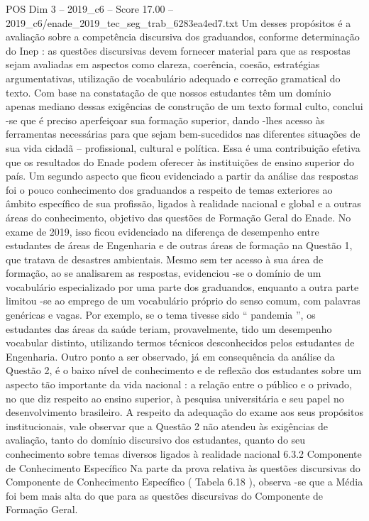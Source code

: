 \begin{textsample}{POS Dim 3 – 2019\_c6 – Score 17.00 – 2019\_c6/enade\_2019\_tec\_seg\_trab\_6283ea4ed7.txt}
Um desses propósitos é a avaliação sobre a competência discursiva dos graduandos, conforme determinação do Inep : as questões discursivas devem fornecer material para que as respostas sejam avaliadas em aspectos como clareza, coerência, coesão, estratégias argumentativas, utilização de vocabulário adequado e correção gramatical do texto.
Com base na constatação de que nossos estudantes têm um domínio apenas mediano dessas exigências de construção de um texto formal culto, conclui -se que é preciso aperfeiçoar sua formação superior, dando -lhes acesso às ferramentas necessárias para que sejam bem-sucedidos nas diferentes situações de sua vida cidadã – profissional, cultural e política.
Essa é uma contribuição efetiva que os resultados do Enade podem oferecer às instituições de ensino superior do país.
Um segundo aspecto que ficou evidenciado a partir da análise das respostas foi o pouco conhecimento dos graduandos a respeito de temas exteriores ao âmbito específico de sua profissão, ligados à realidade nacional e global e a outras áreas do conhecimento, objetivo das questões de Formação Geral do Enade.
No exame de 2019, isso ficou evidenciado na diferença de desempenho entre estudantes de áreas de Engenharia e de outras áreas de formação na Questão 1, que tratava de desastres ambientais.
Mesmo sem ter acesso à sua área de formação, ao se analisarem as respostas, evidenciou -se o domínio de um vocabulário especializado por uma parte dos graduandos, enquanto a outra parte limitou -se ao emprego de um vocabulário próprio do senso comum, com palavras genéricas e vagas.
Por exemplo, se o tema tivesse sido “ pandemia ”, os estudantes das áreas da saúde teriam, provavelmente, tido um desempenho vocabular distinto, utilizando termos técnicos desconhecidos pelos estudantes de Engenharia.
Outro ponto a ser observado, já em consequência da análise da Questão 2, é o baixo nível de conhecimento e de reflexão dos estudantes sobre um aspecto tão importante da vida nacional : a relação entre o público e o privado, no que diz respeito ao ensino superior, à pesquisa universitária e seu papel no desenvolvimento brasileiro.
A respeito da adequação do exame aos seus propósitos institucionais, vale observar que a Questão 2 não atendeu às exigências de avaliação, tanto do domínio discursivo dos estudantes, quanto do seu conhecimento sobre temas diversos ligados à realidade nacional 6.3.2 Componente de Conhecimento Específico Na parte da prova relativa às questões discursivas do Componente de Conhecimento Específico ( Tabela 6.18 ), observa -se que a Média foi bem mais alta do que para as questões discursivas do Componente de Formação Geral.

\end{textsample}
